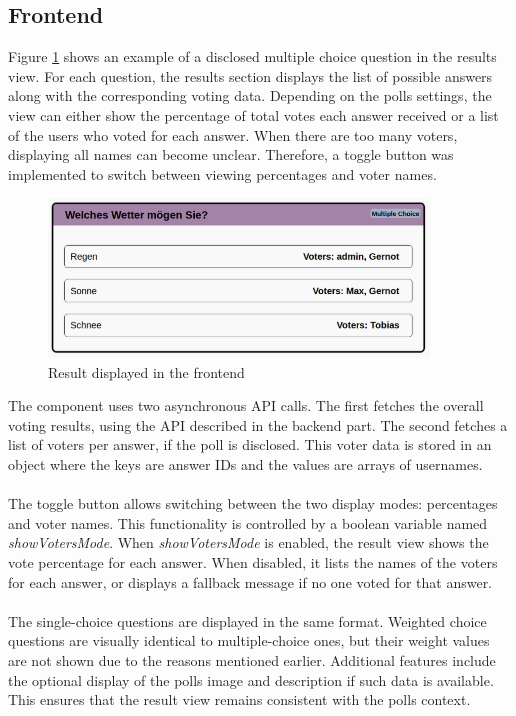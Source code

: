 \documentclass[a4paper,12pt]{report}
\begin{document}
\subsection{Frontend}
Figure \ref{fig:result} shows an example of a disclosed multiple choice question in the results view. For each question, the results section displays the list of possible answers along with the corresponding voting data. Depending on the polls settings, the view can either show the percentage of total votes each answer received or a list of the users who voted for each answer. When there are too many voters, displaying all names can become unclear. Therefore, a toggle button was implemented to switch between viewing percentages and voter names.
\begin{figure}[H] 
	\centering 
	\includegraphics[width=0.9\textwidth]{pics/Results_example.png} 
	\caption{Result displayed in the frontend} 
	\label{fig:result} 
\end{figure}
\noindent
The component uses two asynchronous API calls. The first fetches the overall voting results, using the API described in the backend part. The second fetches a list of voters per answer, if the poll is disclosed. This voter data is stored in an object where the keys are answer IDs and the values are arrays of usernames. \\ \\
The toggle button allows switching between the two display modes: percentages and voter names. This functionality is controlled by a boolean variable named \textit{showVotersMode}. When \textit{showVotersMode} is enabled, the result view shows the vote percentage for each answer. When disabled, it lists the names of the voters for each answer, or displays a fallback message if no one voted for that answer. \\ \\
The single-choice questions are displayed in the same format. Weighted choice questions are visually identical to multiple-choice ones, but their weight values are not shown due to the reasons mentioned earlier. Additional features include the optional display of the polls image and description if such data is available. This ensures that the result view remains consistent with the polls context. \\
\end{document}
